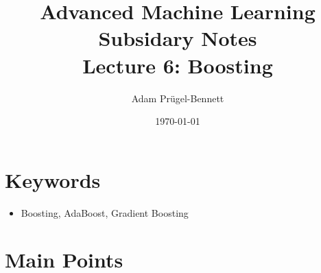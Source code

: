\documentclass[11pt]{article}
\author{Adam Prügel-Bennett}
\date{\today}
\title{Advanced Machine Learning Subsidary Notes\\\medskip
\large Lecture 6: Boosting}
\begin{document}
\maketitle

\section{Keywords}
\label{sec:org407e605}
\begin{itemize}
\item Boosting, AdaBoost, Gradient Boosting
\end{itemize}

\section{Main Points}
\label{sec:orgb9508db}
\end{document}
